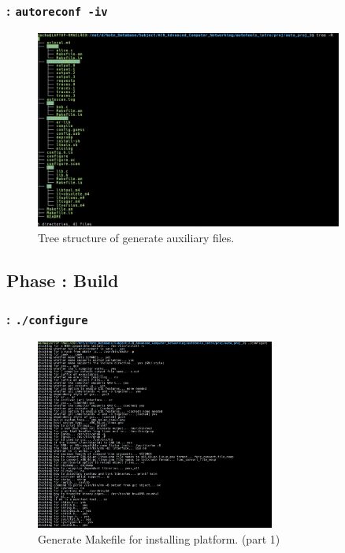 \begin{frame}
    \frametitle{: \texttt{autoreconf -iv}}

    \begin{figure}[H]
        \centering
        \includegraphics[width=0.9\textwidth]{../figure/autotool_2.png}
        \caption*{Tree structure of generate auxiliary files.}
    \end{figure}
\end{frame}

\subsection{Phase : Build}

\begin{frame}
    \frametitle{: \texttt{./configure}}

    \begin{figure}[H]
        \centering
        \includegraphics[width=0.7\textwidth]{../figure/autotool_3.png}
        \caption*{Generate Makefile for installing platform. (part 1)}
    \end{figure}
\end{frame}

